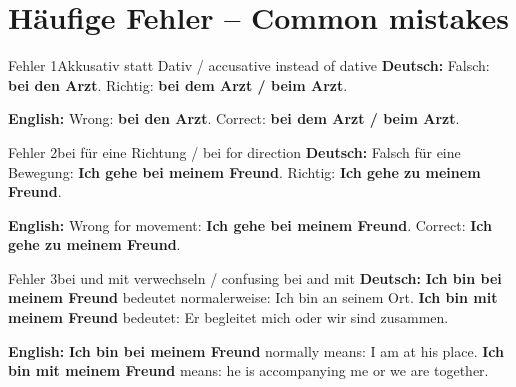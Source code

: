 \documentclass[a4paper,11pt]{article}
\newcommand{\GermanText}[1]{\textbf{Deutsch: }#1\par}
\newcommand{\EnglishText}[1]{{\small\color{SoftGray}\textbf{English: }#1\par}}
\begin{document}
   \section{Häufige Fehler -- Common mistakes}
                                                \begin{grammarentry}{Fehler 1}{Akkusativ statt Dativ / accusative instead of dative}
                                                   \GermanText{Falsch: \textbf{bei den Arzt}. Richtig: \textbf{bei dem Arzt / beim Arzt}.}
                                                   \EnglishText{Wrong: \textbf{bei den Arzt}. Correct: \textbf{bei dem Arzt / beim Arzt}.}
                                                \end{grammarentry}
                                                \begin{grammarentry}{Fehler 2}{bei für eine Richtung / bei for direction}
                                                   \GermanText{Falsch für eine Bewegung: \textbf{Ich gehe bei meinem Freund}. Richtig: \textbf{Ich gehe zu meinem Freund}.}
                                                   \EnglishText{Wrong for movement: \textbf{Ich gehe bei meinem Freund}. Correct: \textbf{Ich gehe zu meinem Freund}.}
                                                \end{grammarentry}
                                                \begin{grammarentry}{Fehler 3}{bei und mit verwechseln / confusing bei and mit}
                                                   \GermanText{\textbf{Ich bin bei meinem Freund} bedeutet normalerweise: Ich bin an seinem Ort. \textbf{Ich bin mit meinem Freund} bedeutet: Er begleitet mich oder wir sind zusammen.}
                                                   \EnglishText{\textbf{Ich bin bei meinem Freund} normally means: I am at his place. \textbf{Ich bin mit meinem Freund} means: he is accompanying me or we are together.}
                                                \end{grammarentry}
\end{document}
